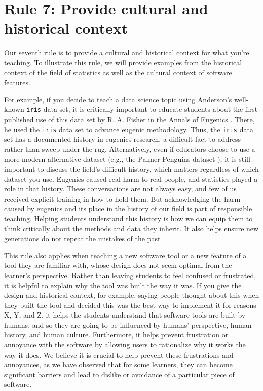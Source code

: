 \documentclass[
  10pt,
  letterpaper,
]{article}
\begin{document}
\section{Rule 7: Provide cultural and historical
context}\label{sec-rule7}

Our seventh rule is to provide a cultural and historical context for
what you're teaching. To illustrate this rule, we will provide examples
from the historical context of the field of statistics as well as the
cultural context of software features.

For example, if you decide to teach a data science topic using
Anderson's well-known \texttt{iris} data set, it is critically important
to educate students about the first published use of this data set by R.
A. Fisher in the Annals of Eugenics \citep{fisher_use_1936}. There, he
used the \texttt{iris} data set to advance eugenic methodology. Thus,
the \texttt{iris} data set has a documented history in eugenics
research, a difficult fact to address rather than sweep under the rug.
Alternatively, even if educators choose to use a more modern alternative
dataset (e.g., the Palmer Penguins dataset
\citep{horst2020palmerpenguins}), it is still important to discuss the
field's difficult history, which matters regardless of which dataset you
use. Eugenics caused real harm to real people, and statistics played a
role in that history. These conversations are not always easy, and few
of us received explicit training in how to hold them. But acknowledging
the harm caused by eugenics and its place in the history of our field is
part of responsible teaching. Helping students understand this history
is how we can equip them to think critically about the methods and data
they inherit. It also helps ensure new generations do not repeat the
mistakes of the past

This rule also applies when teaching a new software tool or a new
feature of a tool they are familiar with, whose design does not seem
optimal from the learner's perspective. Rather than leaving students to
feel confused or frustrated, it is helpful to explain why the tool was
built the way it was. If you give the design and historical context, for
example, saying people thought about this when they built the tool and
decided this was the best way to implement it for reasons X, Y, and Z,
it helps the students understand that software tools are built by
humans, and so they are going to be influenced by humans' perspective,
human history, and human culture. Furthermore, it helps prevent
frustration or annoyance with the software by allowing users to
rationalize why it works the way it does. We believe it is crucial to
help prevent these frustrations and annoyances, as we have observed that
for some learners, they can become significant barriers and lead to
dislike or avoidance of a particular piece of software.
\end{document}

